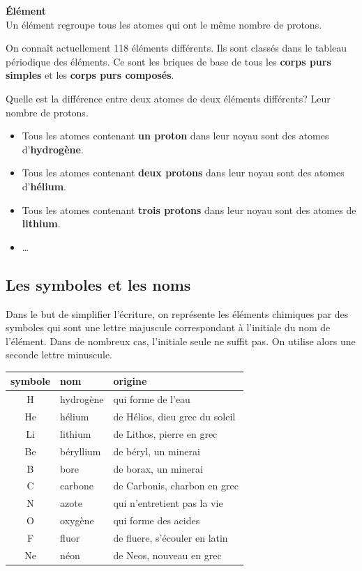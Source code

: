 \documentclass[
  11pt,
  a4paper,
  openany]{book}
\providecommand{\tightlist}{%
  \setlength{\itemsep}{0pt}\setlength{\parskip}{0pt}}
\begin{document}
\begin{tcolorbox}
\textbf{Élément}\\
Un élément regroupe tous les atomes qui ont le même nombre de protons.

\end{tcolorbox}

On connaît actuellement 118 éléments différents. Ils sont classés dans le tableau périodique des éléments. Ce sont les briques de base de tous les \textbf{corps purs simples} et les \textbf{corps purs composés}.

Quelle est la différence entre deux atomes de deux éléments différents? Leur nombre de protons.

\begin{itemize}
\tightlist
\item
  Tous les atomes contenant \textbf{un proton} dans leur noyau sont des atomes d'\textbf{hydrogène}.
\item
  Tous les atomes contenant \textbf{deux protons} dans leur noyau sont des atomes d'\textbf{hélium}.
\item
  Tous les atomes contenant \textbf{trois protons} dans leur noyau sont des atomes de \textbf{lithium}.
\item
  \ldots{}
\end{itemize}

\hypertarget{les-symboles-et-les-noms}{%
\subsection{Les symboles et les noms}\label{les-symboles-et-les-noms}}

Dans le but de simplifier l'écriture, on représente les éléments chimiques par des symboles qui sont une lettre majuscule correspondant à l'initiale du nom de l'élément. Dans de nombreux cas, l'initiale seule ne suffit pas. On utilise alors une seconde lettre minuscule.

\begin{longtable}[]{@{}cll@{}}
\toprule()
symbole & nom & origine \\
\midrule()
\endhead
H & hydrogène & qui forme de l'eau \\
He & hélium & de Hélios, dieu grec du soleil \\
Li & lithium & de Lithos, pierre en grec \\
Be & béryllium & de béryl, un minerai \\
B & bore & de borax, un minerai \\
C & carbone & de Carbonis, charbon en grec \\
N & azote & qui n'entretient pas la vie \\
O & oxygène & qui forme des acides \\
F & fluor & de fluere, s'écouler en latin \\
Ne & néon & de Neos, nouveau en grec \\
\bottomrule()
\end{longtable}
\end{document}
